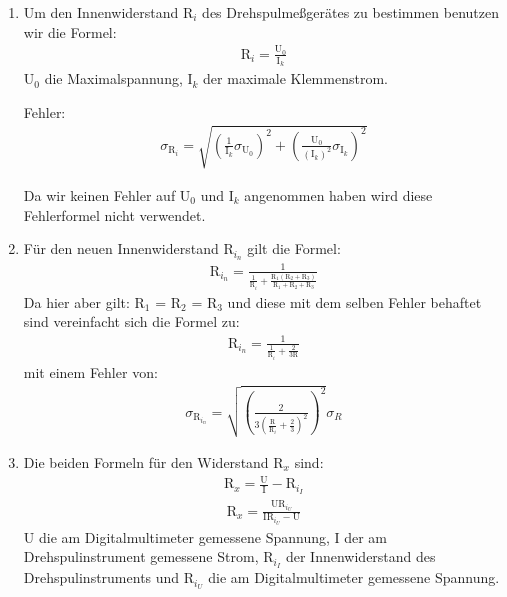 \documentclass[12pt]{scrartcl}
\begin{document}
\begin{enumerate}

	\item
	Um den Innenwiderstand R$_i$ des 				Drehspulmeßgerätes zu bestimmen benutzen 	wir die Formel:
	\begin{align}
	\text{R}_{i}= \frac{\text{U}_0}					{\text{I}_k}
	\label{eqn:aufgabe_1}
	\end{align}
	U$_0$ die Maximalspannung, I$_k$ der maximale Klemmenstrom.
	
	Fehler:
	\begin{align}
	\sigma_{\text{R}_i} = 							\sqrt{\left(\frac{1}{\text{I}_k}\sigma_{\text{U}_0}\right)^2
	+\left(\frac{\text{U}_0}{(\text{I}_k)^2}\sigma_{\text{I}_k}\right)^2}
	\end{align}
	
	Da wir keinen Fehler auf U$_0$ und I$_k$ angenommen haben wird diese Fehlerformel nicht verwendet. 
	\item
	Für den neuen Innenwiderstand R$_{i_n}$ gilt die Formel:
	\begin{align}
	\text{R}_{i_n} = \frac{1}{\frac{1}{\text{R}_i}+\frac{\text{R}_1(\text{R}_2+
	\text{R}_3)}{\text{R}_1+\text{R}_2+\text{R}_3}}	
	\label{eqn:aufgabe_2}
	\end{align}
	Da hier aber gilt: R$_1$ = R$_2$ = R$_3$
	und diese mit dem selben Fehler behaftet sind vereinfacht sich die Formel zu:
	\begin{align}
	\text{R}_{i_n} = \frac{1}{\frac{1}{\text{R}_i}+\frac{2}{3\text{R}}}
	\end{align}
	mit einem Fehler von:
	\begin{align}
	\sigma_{\text{R}_{i_n}} = \sqrt{\left(\frac{2}{3\left(\frac{\text{R}}{\text{R}_i}+\frac{2}{3}\right)^2}\right)^2}\sigma_R
	\label{eqn:aufgabe_2_sigma}
	\end{align}
	\item
	Die beiden Formeln für den Widerstand 			R$_x$ sind:
	\begin{align}
	\text{R}_x=\frac{\text{U}}						{\text{I}}-\text{R}_{i_I}
	\label{eqn:aufgabe_3_schaltung_2}
	\end{align}
	\begin{align}
	\text{R}_x= 										\frac{\text{U}\text{R}_{i_U}}					{\text{I}\text{R}_{i_U}-\text{U}}
	\label{eqn:aufgabe_3_schaltung_1}
	\end{align}
	U die am Digitalmultimeter gemessene 			Spannung, I der am Drehspulinstrument 			gemessene Strom, R$_{i_I}$ der 					Innenwiderstand des Drehspulinstruments 			und R$_{i_U}$ die am Digitalmultimeter 			gemessene Spannung.
	

\end{enumerate}
\end{document}
